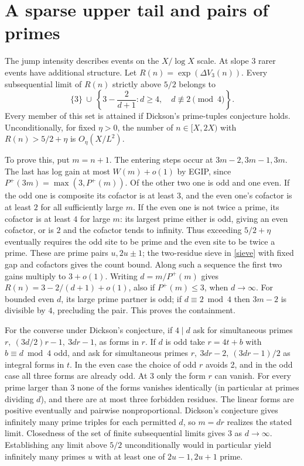 \documentclass[10pt]{article}
\begin{document}
\section{A sparse upper tail and pairs of primes}
The jump intensity describes events on the $X/\log X$ scale. At slope $3$ rarer events have additional structure. Let $R(n)=\exp(\Delta V_3(n))$. Every subsequential limit of $R(n)$ strictly above $5/2$ belongs to
\[
 \{3\}\ \cup\
 \left\{3-\frac{2}{d+1}: d\ge4,\quad d\not\equiv2\pmod4\right\}.
\]
Every member of this set is attained if Dickson's prime-tuples conjecture holds. Unconditionally, for fixed $\eta>0$, the number of $n\in[X,2X)$ with $R(n)>5/2+\eta$ is $O_\eta(X/L^2)$.

To prove this, put $m=n+1$. The entering steps occur at $3m-2,3m-1,3m$. The last has log gain at most $W(m)+o(1)$ by EGIP, since $P^+(3m)=\max(3,P^+(m))$. Of the other two one is odd and one even. If the odd one is composite its cofactor is at least $3$, and the even one's cofactor is at least $2$ for all sufficiently large $m$. If the even one is not twice a prime, its cofactor is at least $4$ for large $m$: its largest prime either is odd, giving an even cofactor, or is $2$ and the cofactor tends to infinity. Thus exceeding $5/2+\eta$ eventually requires the odd site to be prime and the even site to be twice a prime. These are prime pairs $u,2u\pm1$; the two-residue sieve in \eqref{sieve} with fixed gap and cofactors gives the count bound. Along such a sequence the first two gains multiply to $3+o(1)$. Writing $d=m/P^+(m)$ gives $R(n)=3-2/(d+1)+o(1)$, also if $P^+(m)\le3$, when $d\to\infty$. For bounded even $d$, its large prime partner is odd; if $d\equiv2\bmod4$ then $3m-2$ is divisible by $4$, precluding the pair. This proves the containment.

For the converse under Dickson's conjecture, if $4\mid d$ ask for simultaneous primes $r,\ (3d/2)r-1,\ 3dr-1$, as forms in $r$. If $d$ is odd take $r=4t+b$ with $b\equiv d\bmod4$ odd, and ask for simultaneous primes $r,\ 3dr-2,\ (3dr-1)/2$ as integral forms in $t$. In the even case the choice of odd $r$ avoids 2, and in the odd case all three forms are already odd. At 3 only the form $r$ can vanish. For every prime larger than 3 none of the forms vanishes identically (in particular at primes dividing $d$), and there are at most three forbidden residues. The linear forms are positive eventually and pairwise nonproportional. Dickson's conjecture gives infinitely many prime triples for each permitted $d$, so $m=dr$ realizes the stated limit. Closedness of the set of finite subsequential limits gives $3$ as $d\to\infty$. Establishing any limit above $5/2$ unconditionally would in particular yield infinitely many primes $u$ with at least one of $2u-1,2u+1$ prime.
\end{document}
